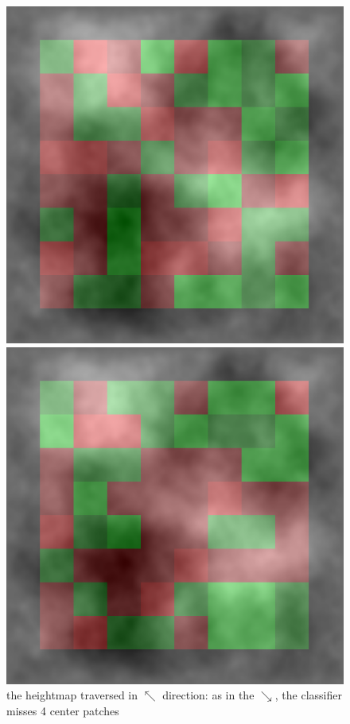 \documentclass[]{usiinfbachelorproject}
\begin{document}
\begin{figure}[H]
  \includegraphics[width=\linewidth]{heatmap225}
    \caption{the heightmap traversed in $\nwarrow$ direction: as in the $\searrow$, the classifier misses 4 center patches}\label{fig:heatmap225}
\endminipage\hfill
{}
  \includegraphics[width=\linewidth]{heatmap270}

\end{figure}
\end{document}
